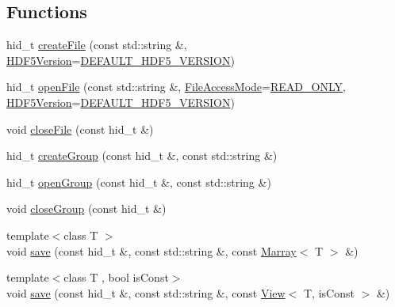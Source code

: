 \subsection*{Functions}
\begin{DoxyCompactItemize}
\item 
hid\+\_\+t \hyperlink{namespaceandres_1_1hdf5_a1f779b6e42349512d5227fbb6dcf92cd}{create\+File} (const std\+::string \&, \hyperlink{namespaceandres_1_1hdf5_ad5194a7b8773d3776e8dfc068f58f41b}{H\+D\+F5\+Version}=\hyperlink{namespaceandres_1_1hdf5_ad5194a7b8773d3776e8dfc068f58f41baf4fdc18c306e5d07105ad62a1cf6fa93}{D\+E\+F\+A\+U\+L\+T\+\_\+\+H\+D\+F5\+\_\+\+V\+E\+R\+S\+I\+O\+N})
\item 
hid\+\_\+t \hyperlink{namespaceandres_1_1hdf5_a3645de3466468274059f8475066ff820}{open\+File} (const std\+::string \&, \hyperlink{namespaceandres_1_1hdf5_a08660935c7de0e1e76e007fc972933b9}{File\+Access\+Mode}=\hyperlink{namespaceandres_1_1hdf5_a08660935c7de0e1e76e007fc972933b9af05cb745b770e55c64efe88162f7e9fb}{R\+E\+A\+D\+\_\+\+O\+N\+L\+Y}, \hyperlink{namespaceandres_1_1hdf5_ad5194a7b8773d3776e8dfc068f58f41b}{H\+D\+F5\+Version}=\hyperlink{namespaceandres_1_1hdf5_ad5194a7b8773d3776e8dfc068f58f41baf4fdc18c306e5d07105ad62a1cf6fa93}{D\+E\+F\+A\+U\+L\+T\+\_\+\+H\+D\+F5\+\_\+\+V\+E\+R\+S\+I\+O\+N})
\item 
void \hyperlink{namespaceandres_1_1hdf5_afa6545825e5557eecf6ac1e8fc68bb56}{close\+File} (const hid\+\_\+t \&)
\item 
hid\+\_\+t \hyperlink{namespaceandres_1_1hdf5_ac03dd5212231c5335a0a02edb3c0d879}{create\+Group} (const hid\+\_\+t \&, const std\+::string \&)
\item 
hid\+\_\+t \hyperlink{namespaceandres_1_1hdf5_a3d7159f65f86576c9142409b08afcfc9}{open\+Group} (const hid\+\_\+t \&, const std\+::string \&)
\item 
void \hyperlink{namespaceandres_1_1hdf5_a1aaf506863ec820cdcc827c7997d4ba3}{close\+Group} (const hid\+\_\+t \&)
\item 
{\footnotesize template$<$class T $>$ }\\void \hyperlink{namespaceandres_1_1hdf5_a0bc471ab828dcfdedd90dc6f991b509e}{save} (const hid\+\_\+t \&, const std\+::string \&, const \hyperlink{classandres_1_1Marray}{Marray}$<$ T $>$ \&)
\item 
{\footnotesize template$<$class T , bool is\+Const$>$ }\\void \hyperlink{namespaceandres_1_1hdf5_ac6995803b0ec6079698d61563b5de104}{save} (const hid\+\_\+t \&, const std\+::string \&, const \hyperlink{classandres_1_1View}{View}$<$ T, is\+Const $>$ \&)

\end{DoxyCompactItemize}
